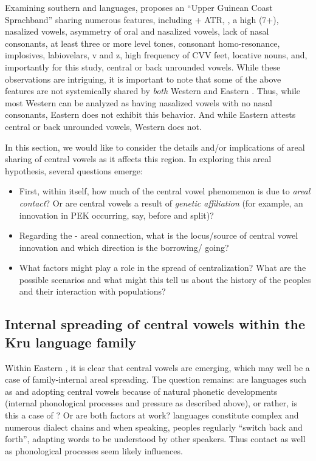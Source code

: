 \documentclass[output=paper
,newtxmath
,modfonts
,nonflat]{langsci/langscibook}
\begin{document}
Examining southern  and  languages, \citet[92, 112]{Vydrine2009} proposes an “Upper Guinean Coast Sprachband” sharing numerous features, including + ATR, , a high  (7+), nasalized vowels, asymmetry of oral and nasalized vowels, lack of nasal consonants, at least three or more level tones, consonant homo-resonance, implosives, labiovelars, v and z, high frequency of CVV feet, locative nouns, and, importantly for this study, central or back unrounded vowels. While these observations are intriguing, it is important to note that some of the above features are not systemically shared by \textit{both} Western and Eastern . Thus, while most Western  can be analyzed as having nasalized vowels with no nasal consonants, Eastern  does not exhibit this behavior. And while Eastern  attests central or back unrounded vowels, Western  does not.  

In this section, we would like to consider the details and/or implications of areal sharing of central vowels as it affects this region. In exploring this areal hypothesis, several questions emerge:

\begin{itemize}
\item First, within  itself, how much of the central vowel phenomenon is due to \textit{areal contact}?  Or are central vowels a result of \textit{genetic affiliation} (for example, an innovation in PEK occurring, say, before   and  split)? \\[-0.75cm]
\item Regarding the - areal connection, what is the locus/source of central vowel innovation and which direction is the borrowing/ going?\\[-0.75cm]
\item What factors might play a role in the spread of centralization? What are the possible scenarios and what might this tell us about the history of the  peoples and their interaction with  populations?
\end{itemize}

\subsection{Internal spreading of central vowels within the Kru language family}\label{sec:zogbo:5.1} 

Within Eastern , it is clear that central vowels are emerging, which may well be a case of family-internal areal spreading.  The question remains: are languages such as  and  adopting central vowels because of natural phonetic developments (internal phonological processes and pressure as described above), or rather, is this a case of ? Or are both factors at work?   languages constitute complex and numerous dialect chains and when speaking,  peoples regularly “switch back and forth”, adapting words to be understood by other  speakers. Thus contact as well as phonological processes seem likely influences.    
\end{document}
